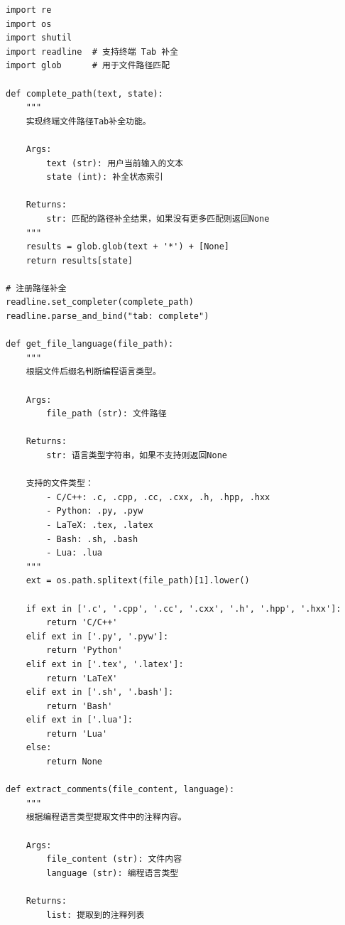\begin{lstlisting}[style=pythonstyle, title={递归删除整个文件夹中注释.py}]
import re
import os
import shutil
import readline  # 支持终端 Tab 补全
import glob      # 用于文件路径匹配

def complete_path(text, state):
    """
    实现终端文件路径Tab补全功能。
    
    Args:
        text (str): 用户当前输入的文本
        state (int): 补全状态索引
        
    Returns:
        str: 匹配的路径补全结果，如果没有更多匹配则返回None
    """
    results = glob.glob(text + '*') + [None]
    return results[state]

# 注册路径补全
readline.set_completer(complete_path)
readline.parse_and_bind("tab: complete")

def get_file_language(file_path):
    """
    根据文件后缀名判断编程语言类型。
    
    Args:
        file_path (str): 文件路径
        
    Returns:
        str: 语言类型字符串，如果不支持则返回None
        
    支持的文件类型：
        - C/C++: .c, .cpp, .cc, .cxx, .h, .hpp, .hxx
        - Python: .py, .pyw
        - LaTeX: .tex, .latex  
        - Bash: .sh, .bash
        - Lua: .lua
    """
    ext = os.path.splitext(file_path)[1].lower()
    
    if ext in ['.c', '.cpp', '.cc', '.cxx', '.h', '.hpp', '.hxx']:
        return 'C/C++'
    elif ext in ['.py', '.pyw']:
        return 'Python'
    elif ext in ['.tex', '.latex']:
        return 'LaTeX'
    elif ext in ['.sh', '.bash']:
        return 'Bash'
    elif ext in ['.lua']:
        return 'Lua'
    else:
        return None

def extract_comments(file_content, language):
    """
    根据编程语言类型提取文件中的注释内容。
    
    Args:
        file_content (str): 文件内容
        language (str): 编程语言类型
        
    Returns:
        list: 提取到的注释列表
        

\end{lstlisting}
